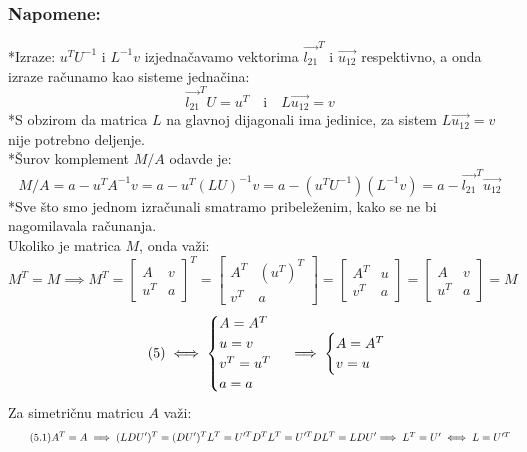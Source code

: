 \documentclass[11pt]{article}
\begin{document}
\subsubsection*{Napomene:} *Izraze: $u^TU^{-1} $ i $L^{-1}v$ izjednačavamo vektorima $\overrightarrow{l_{21}}^T$ i $\overrightarrow{u_{12}} $ respektivno, a onda izraze računamo kao sisteme jednačina:$$\overrightarrow{l_{21}}^TU=u^T \quad \text{i} \quad L\overrightarrow{u_{12}}=v$$
*S obzirom da matrica $L$ na glavnoj dijagonali ima jedinice, za sistem $L\overrightarrow{u_{12}}=v$ nije potrebno deljenje.\\
*Šurov komplement $M/A$ odavde je: $$M/A=a-u^TA^{-1}v=a-u^T(LU)^{-1}v=a-(u^TU^{-1})(L^{-1}v)=a-\overrightarrow{l_{21}}^T\overrightarrow{u_{12}}$$
 *Sve što smo jednom izračunali smatramo pribeleženim, kako se ne bi nagomilavala računanja.\vspace{5mm}\\
Ukoliko je matrica $M$, onda važi:
$$ M^T=M \implies
M^T
=
\begin{bmatrix}
A & v \\ u^T & a
\end{bmatrix}^T
=
\begin{bmatrix}
A^T & (u^T)^T \\ v^T & a
\end{bmatrix}
=
\begin{bmatrix}
A^T & u \\ v^T & a
\end{bmatrix}
=
\begin{bmatrix}
A & v \\ u^T & a
\end{bmatrix}
=
M$$
\begin{equation*}\tag{5}\label{eq5}
\iff 
\begin{cases}
A=A^T \\
u=v \\
v^T = u^T \\
a=a
\end{cases}
\implies 
\begin{cases}
A=A^T \\
v=u
\end{cases}\vspace{3mm}
\end{equation*}
Za simetričnu matricu $A$ važi:\\
\begin{equation*}\tag{5.1}\label{eq5.1}
A^T=A \implies (LDU')^T=(DU')^TL^T=U'^TD^TL^T=U'^T D L^T=LDU'
$$$$
\implies L^T=U' \iff L=U'^T
\end{equation*}
\end{document}
